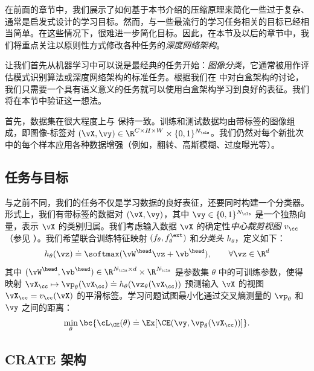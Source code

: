 \documentclass[../../book-main_zh.tex]{subfiles}
\begin{document}
在前面的章节中，我们展示了如何基于本书介绍的压缩原理来简化一些过于复杂、通常是启发式设计的学习目标。然而，与一些最流行的学习任务相关的目标已经相当简单。在这些情况下，很难进一步简化目标。因此，在本节及以后的章节中，我们将重点关注以原则性方式修改各种任务的\textit{深度网络架构}。

让我们首先从机器学习中可以说是最经典的任务开始：\textit{图像分类}，它通常被用作评估模式识别算法或深度网络架构的标准任务。根据我们在  中对白盒架构的讨论，我们只需要一个具有语义意义的任务就可以使用白盒架构学习到良好的表征。我们将在本节中验证这一想法。

首先，数据集在很大程度上与  保持一致。训练和测试数据均由带标签的图像组成，即图像-标签对 \((\vX, \vy) \in \R^{C \times H \times W} \times \{0, 1\}^{N_{\cls}}\)。我们仍然对每个新批次中的每个样本应用各种数据增强（例如，翻转、高斯模糊、过度曝光等）。

\subsection{任务与目标} \label{sub:image_classification_objective}

与之前不同，我们的任务不仅是学习数据的良好表征，还要同时构建一个分类器。形式上，我们有带标签的数据对 \((\vX, \vy)\)，其中 \(\vy \in \{0, 1\}^{N_{\cls}}\) 是一个独热向量，表示 \(\vX\) 的类别归属。我们考虑输入数据 \(\vX\) 的确定性\textit{中心裁剪视图} \(v_{\cc}\)（参见 ）。我们希望联合训练特征映射 \((f_{\theta}, f_{\theta}^{\ext})\) 和\textit{分类头} \(h_{\theta}\)，定义如下：
\begin{equation}
h_{\theta}(\vz) \doteq \softmax(\vW^{\head}\vz + \vb^{\head}), \qquad
\forall \vz \in \R^{d}
\end{equation}
其中 \((\vW^{\head}, \vb^{\head}) \in \R^{N_{\cls} \times d} \times
\R^{N_{\cls}}\) 是参数集 \(\theta\) 中的可训练参数，使得映射 \(\vX_{\cc} \mapsto
\vp_{\theta}(\vX_{\cc}) \doteq h_{\theta}(\vz_{\theta}(\vX_{\cc}))\)
预测输入 \(\vX\) 的视图 \(\vX_{\cc} = v_{\cc}(\vX)\) 的平滑标签。学习问题试图最小化通过交叉熵测量的 \(\vp_{\theta}\) 和 \(\vy\) 之间的距离：
\begin{equation}\label{eq:classification_ce_loss}
\min_{\theta}\bc{\cL_{\CE}(\theta) \doteq \Ex[\CE(\vy,
\vp_{\theta}(\vX_{\cc}))]}.
\end{equation}

\subsection{CRATE 架构}\label{sub:image_classification_architecture}
\end{document}

